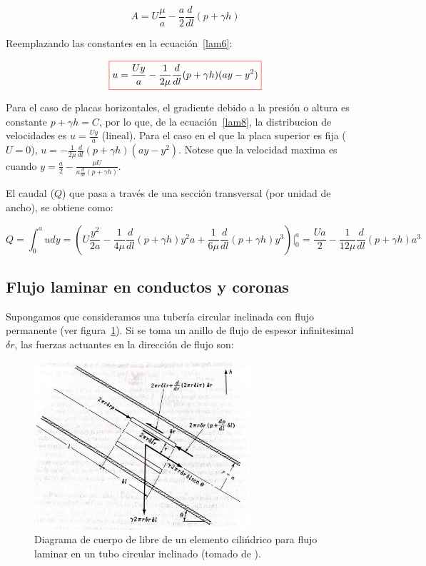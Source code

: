\documentclass[11pt, oneside]{article}
\begin{document}
\begin{equation}
A = U\frac{\mu}{a} - \frac{a}{2}\frac{d}{dl} (p + \gamma h)
\label{lam7}
\end{equation}

Reemplazando las constantes en la ecuaci\'on~\ref{lam6}:

\begin{equation}
\color{red}\boxed{\color{black} u = \frac{Uy}{a}-\frac{1}{2\mu}\frac{d}{dl}(p + \gamma h)( ay - y^2 ) }
\label{lam8}
\end{equation}

Para el caso de placas horizontales, el gradiente debido a la presi\'on o altura es constante $p+ \gamma h = C$, por lo que, de la ecuaci\'on~\ref{lam8}, la distribucion de velocidades es $u = \frac{Uy}{a}$ (lineal). Para el caso en el que la placa superior es fija ($U=0$), $u = -\frac{1}{2\mu}\frac{d}{dl}(p + \gamma h)( ay - y^2 )$. Notese que la velocidad maxima es cuando $y = \frac{a}{2} - \frac{\mu U}{a \frac{d}{dl}(p + \gamma h)}$. 

El caudal ($Q$) que pasa a trav\'es de una secci\'on transversal (por unidad de ancho), se obtiene como:

\begin{equation}
Q = \int_0^a u dy = \left( U\frac{y^2}{2a} - \frac{1}{4\mu}\frac{d}{dl}(p+ \gamma h) y^2 a + \frac{1}{6\mu}\frac{d}{dl}(p+ \gamma h) y^3 \right) \bigg|_0^a = \frac{Ua}{2} - \frac{1}{12\mu}\frac{d}{dl}(p + \gamma h)a^3
\label{lam9}
\end{equation}

\subsection{Flujo laminar en conductos y coronas} %
Supongamos que consideramos una tuber\'ia circular inclinada con flujo permanente (ver figura~\ref{lamt}). Si se toma un anillo de flujo de espesor infinitesimal $\delta r$, las fuerzas actuantes en la direcci\'on de flujo son:

\begin{figure}[h]
\centering
\includegraphics[width=8cm]{lamt.jpeg}
\caption{Diagrama de cuerpo de libre de un elemento cili\'ndrico para flujo laminar en un tubo circular inclinado (tomado de \cite{streeter}).}
\label{lamt}
\end{figure}
\end{document}
